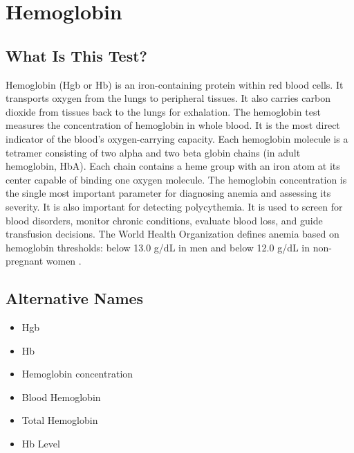 \chapter{Hemoglobin}

\section*{What Is This Test?}
Hemoglobin (Hgb or Hb) is an iron-containing protein within red blood cells. It transports oxygen from the lungs to peripheral tissues. It also carries carbon dioxide from tissues back to the lungs for exhalation. The hemoglobin test measures the concentration of hemoglobin in whole blood. It is the most direct indicator of the blood's oxygen-carrying capacity. Each hemoglobin molecule is a tetramer consisting of two alpha and two beta globin chains (in adult hemoglobin, HbA). Each chain contains a heme group with an iron atom at its center capable of binding one oxygen molecule. The hemoglobin concentration is the single most important parameter for diagnosing anemia and assessing its severity. It is also important for detecting polycythemia. It is used to screen for blood disorders, monitor chronic conditions, evaluate blood loss, and guide transfusion decisions. The World Health Organization defines anemia based on hemoglobin thresholds: below 13.0 g/dL in men and below 12.0 g/dL in non-pregnant women \cite{who2011haemoglobin}.

\section*{Alternative Names}
\begin{itemize}
  \item Hgb
  \item Hb
  \item Hemoglobin concentration
  \item Blood Hemoglobin
  \item Total Hemoglobin
  \item Hb Level
\end{itemize}
